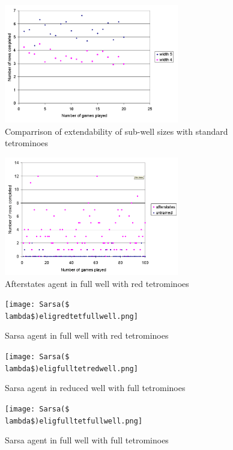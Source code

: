 \documentclass{rucsthesis}
\begin{document}
\begin{figure}[h]
\centering
\includegraphics[width=3in]{widthcomparrisonfulltet.png}
\caption{Comparrison of extendability of sub-well sizes with standard tetrominoes}
\label{fig:comparemelax}
\end{figure}


\begin{figure}[h]
\centering
\includegraphics[width=3in]{Afterstatesredtetfullwell.png}
\caption{Afterstates agent in full well with red tetrominoes}
\label{fig:comparemelax}
\end{figure}

\begin{figure}[h]
\centering
\texttt{[image: Sarsa(\$\\lambda\$)eligredtetfullwell.png]}
\caption{Sarsa agent in full well with red tetrominoes}
\label{fig:comparemelax}
\end{figure}

\begin{figure}[h]
\centering
\texttt{[image: Sarsa(\$\\lambda\$)eligfulltetredwell.png]}
\caption{Sarsa agent in reduced well with full tetrominoes}
\label{fig:comparemelax}
\end{figure}

\begin{figure}[h]
\centering
\texttt{[image: Sarsa(\$\\lambda\$)eligfulltetfullwell.png]}
\caption{Sarsa agent in full well with full tetrominoes}
\label{fig:comparemelax}
\end{figure}
\end{document}
